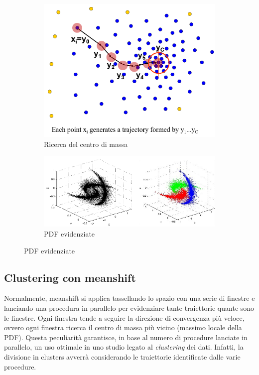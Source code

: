 \documentclass[a4paper,oneside,titlepage]{book}
\begin{document}
\begin{figure}[htp]
	\begin{subfigure}{0.49\textwidth}
	    \centering
		\includegraphics[width=\textwidth, height=\textheight, keepaspectratio]{ms3.png}
		\caption{Ricerca del centro di massa}
	\end{subfigure}
	\hfill
	\begin{subfigure}{0.49\textwidth}
	    \centering
		\includegraphics[width=\textwidth, height=\textheight, keepaspectratio]{ms4.png}
		\caption{PDF evidenziate}
	\end{subfigure}
\end{figure}

\subsection{Clustering con meanshift}
Normalmente, meanshift si applica tassellando lo spazio con una serie di finestre e lanciando una procedura in parallelo per evidenziare tante traiettorie quante sono le finestre. Ogni finestra tende a seguire la direzione di convergenza più veloce, ovvero ogni finestra ricerca il centro di massa più vicino (massimo locale della PDF). Questa peculiarità garantisce, in base al numero di procedure lanciate in parallelo, un uso ottimale in uno studio legato al \textit{clustering} dei dati. Infatti, la divisione in clusters avverrà considerando le traiettorie identificate dalle varie procedure.
\end{document}
